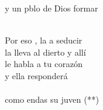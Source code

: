 \documentclass[12pt]{article}
\begin{document}
\begin{multicols*}{2}
\begin{cancion}
	y un pblo de Dios formar  \\\jump\\
	\begin{chorus}%
	Por eso , la  a seducir\\
	la lleva al dierto y allí\\
	le habla a tu corazón \\
	y ella  responderá\\
{}\vspace*{-0.4cm}\\
	como endas  su juven (**)\\
	\end{chorus}%
	\jump\\
\end{cancion}%


\end{multicols*}
\end{document}
